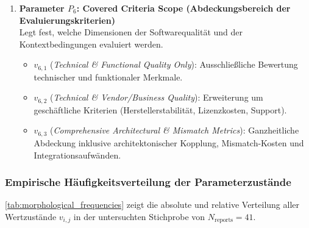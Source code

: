\begin{enumerate}
    \item \textbf{Parameter $P_6$: Covered Criteria Scope (Abdeckungsbereich der Evaluierungskriterien)} \\
    Legt fest, welche Dimensionen der Softwarequalität und der Kontextbedingungen evaluiert werden.
    \begin{itemize}
        \item $v_{6,1}$ (\textit{Technical \& Functional Quality Only}): Ausschließliche Bewertung technischer und funktionaler Merkmale.
        \item $v_{6,2}$ (\textit{Technical \& Vendor/Business Quality}): Erweiterung um geschäftliche Kriterien (Herstellerstabilität, Lizenzkosten, Support).
        \item $v_{6,3}$ (\textit{Comprehensive Architectural \& Mismatch Metrics}): Ganzheitliche Abdeckung inklusive architektonischer Kopplung, Mismatch-Kosten und Integrationsaufwänden.
    \end{itemize}
\end{enumerate}

\subsubsection{Empirische Häufigkeitsverteilung der Parameterzustände}

\autoref{tab:morphological_frequencies} zeigt die absolute und relative Verteilung aller Wertzustände $v_{i,j}$ in der untersuchten Stichprobe von $N_{\text{reports}} = 41$.


